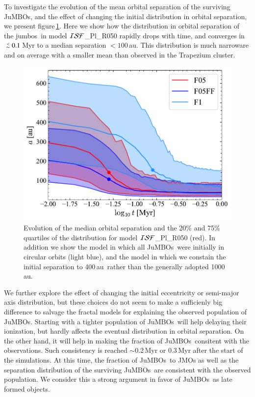 \documentclass[submission,phys]{lib/SciPost}
\def\aplt{\ {\raise-.5ex\hbox{$\buildrel<\over\sim$}}\ }
\newcommand{\jumbos}{\mbox{JuMBOs}}
\begin{document}
To investigate the evolution of the mean orbital separation of the
surviving \jumbos, and the effect of changing the initial distribution
in orbital separation, we present
figure\,\ref{Fig:sma_vs_time_model_ISF_Fr}. Here we show how the
distribution in orbital separation of the jumbos\, in model ${\cal
  ISF}$\_Pl\_R050 rapidly drops with time, and converges in $\aplt
0.1$\,Myr to a median separation $<100$\,au. This distribution is much
narroware and on average with a smaller mean than observed in the
Trapezium cluster.

\begin{figure}
  \centering
        \includegraphics[width=0.75\columnwidth]{figures/Fractal_General_sem_evol.pdf}
        \caption{Evolution of the median orbital separation and the
          20\% and 75\% quartiles of the distribution for model ${\cal
            ISF}$\_Pl\_R050 (red).  In addition we show the model in
          which all \jumbos\, were initially in circular orbits (light
          blue), and the model in which we constain the initial
          separation to 400\,au\, rather than the generally adopted
          1000\,au. }
        \label{Fig:sma_vs_time_model_ISF_Fr}
\end{figure}

We further explore the effect of changing the initial eccentricity or
semi-major axis distribution, but these choices do not seem to make a
sufficienly big difference to salvage the fractal models for
explaining the observed population of \jumbos.  Starting with a
tighter population of \jumbos\, will help delaying their ionization,
but hardly affects the eventual distribution in orbital separation.
On the other hand, it will help in making the fraction of \jumbos\,
consitent with the observations. Such consistency is reached $\sim
0.2$\,Myr or $0.3$\,Myr after the start of the simulations.  At this
time, the fraction of \jumbos\, to JMOs as well as the separation
distribution of the surviving \jumbos\, are consistent with the
observed population. We consider this a strong argument in favor of
\jumbos\, as late formed objects.
\end{document}
